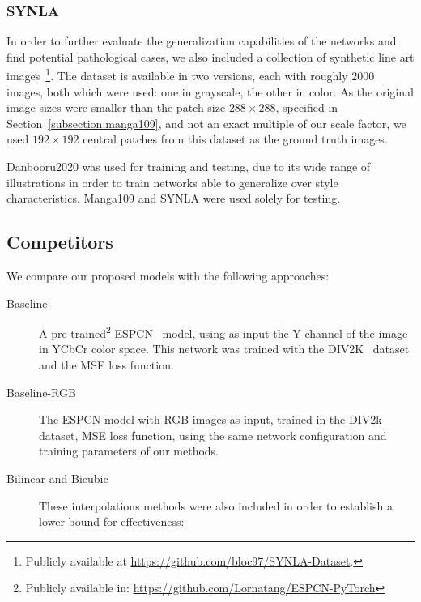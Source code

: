 \subsubsection{SYNLA}

In order to further evaluate the generalization capabilities of the networks and find potential pathological cases, we also included a collection of synthetic line art images~\cite{synla}\footnote{Publicly available at \url{https://github.com/bloc97/SYNLA-Dataset}.}. The dataset is available in two versions, each with roughly $2000$ images, both which were used: one in grayscale, the other in color. As the original image sizes were smaller than the patch size ${288\times288}$, specified in Section~\ref{subsection:manga109}, and not an exact multiple of our scale factor, we used ${192\times192}$ central patches from this dataset as the ground truth images.

Danbooru2020 was used for training and testing, due to its wide range of illustrations in order to train networks able to generalize over style characteristics. Manga109 and SYNLA were used solely for testing.

\subsection{Competitors}

We compare our proposed models with the following approaches:

\begin{description}
    \item[Baseline]
          A pre-trained\footnote{Publicly available in: \url{https://github.com/Lornatang/ESPCN-PyTorch}} ESPCN~\cite{shi2016realtime} model, using as input the Y-channel of the image in YCbCr color space.
          This network was trained with the DIV2K~\cite{Agustsson_2017_CVPR_Workshops} dataset and the MSE loss function.

    \item[Baseline-RGB]
          The ESPCN model with RGB images as input, trained in the DIV2k dataset, MSE loss function, using the same network configuration and training parameters of our methods.

    \item[Bilinear and Bicubic]
          These interpolations methods were also included in order to establish a lower bound for effectiveness: 
\end{description}

